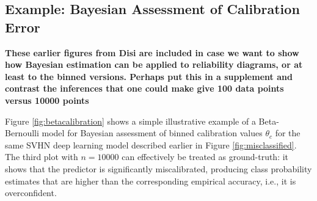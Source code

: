 \documentclass{article}
\begin{document}
\subsection*{Example: Bayesian Assessment of Calibration Error}

{\bf These earlier figures from Disi are included in case we want to show how Bayesian estimation can be applied to reliability diagrams, or at least to the binned versions. Perhaps put this in a supplement and contrast the inferences that one could make give 100 data points versus 10000 points}

Figure \ref{fig:betacalibration} shows a simple illustrative example of a Beta-Bernoulli model for Bayesian assessment of binned calibration values $\theta_c$ for the same SVHN deep learning model described earlier in Figure \ref{fig:misclassified}.
The third plot with $n=10000$ can effectively be treated as ground-truth: it shows that the predictor is significantly miscalibrated, producing class probability estimates that are higher than the corresponding empirical accuracy, i.e., it is overconfident.
\end{document}
